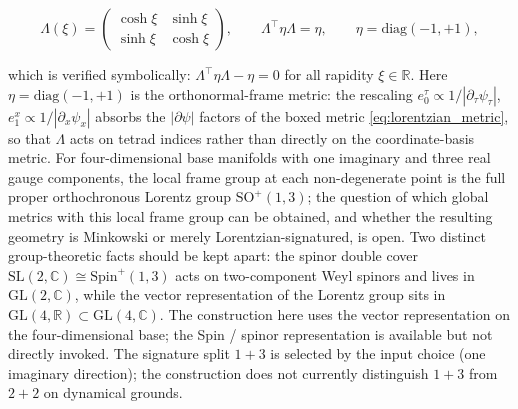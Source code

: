\documentclass[11pt]{article}
\begin{document}
\begin{equation}
\Lambda(\xi) = \begin{pmatrix} \cosh\xi & \sinh\xi \\ \sinh\xi & \cosh\xi \end{pmatrix}, \qquad \Lambda^\top \eta\Lambda = \eta, \qquad \eta = \mathrm{diag}(-1, +1),
\end{equation}

which is verified symbolically: $\Lambda^\top \eta\Lambda - \eta = 0$ for all rapidity $\xi \in \mathbb{R}$. Here $\eta = \mathrm{diag}(-1, +1)$ is the orthonormal-frame metric: the rescaling $e_0^\tau \propto 1/|\partial_\tau\psi_\tau|$, $e_1^x \propto 1/|\partial_x\psi_x|$ absorbs the $|\partial\psi|$ factors of the boxed metric \eqref{eq:lorentzian_metric}, so that $\Lambda$ acts on tetrad indices rather than directly on the coordinate-basis metric. For four-dimensional base manifolds with one imaginary and three real gauge components, the local frame group at each non-degenerate point is the full proper orthochronous Lorentz group $\mathrm{SO}^+(1,3)$; the question of which global metrics with this local frame group can be obtained, and whether the resulting geometry is Minkowski or merely Lorentzian-signatured, is open. Two distinct group-theoretic facts should be kept apart: the spinor double cover $\mathrm{SL}(2,\mathbb{C}) \cong \mathrm{Spin}^+(1,3)$ acts on two-component Weyl spinors and lives in $\mathrm{GL}(2,\mathbb{C})$, while the vector representation of the Lorentz group sits in $\mathrm{GL}(4,\mathbb{R}) \subset \mathrm{GL}(4,\mathbb{C})$. The construction here uses the vector representation on the four-dimensional base; the Spin / spinor representation is available but not directly invoked. The signature split $1{+}3$ is selected by the input choice (one imaginary direction); the construction does not currently distinguish $1{+}3$ from $2{+}2$ on dynamical grounds.
\end{document}
